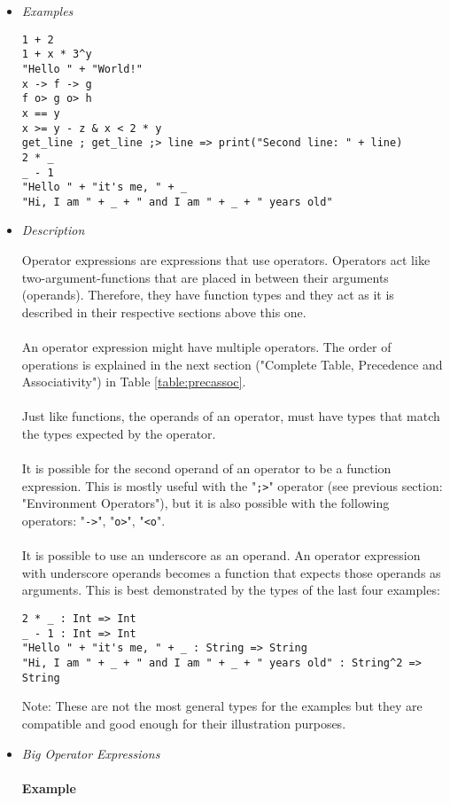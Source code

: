 \documentclass{article}
\begin{document}
\begin{itemize}
\item \textit{Examples}
\begin{verbatim}
1 + 2
1 + x * 3^y
"Hello " + "World!"
x -> f -> g
f o> g o> h
x == y
x >= y - z & x < 2 * y
get_line ; get_line ;> line => print("Second line: " + line)
2 * _
_ - 1
"Hello " + "it's me, " + _
"Hi, I am " + _ + " and I am " + _ + " years old"
\end{verbatim}

\item \textit{Description}

Operator expressions are expressions that use operators. Operators act like
two-argument-functions that are placed in between their arguments (operands).
Therefore, they have function types and they act as it is described in their
respective sections above this one.
\\\\
An operator expression might have multiple operators. The order of operations
is explained in the next section ("Complete Table, Precedence and
Associativity") in Table \ref{table:precassoc}.
\\\\
Just like functions, the operands of an operator, must have types that match
the types expected by the operator.
\\\\
It is possible for the second operand of an operator to be a function
expression.  This is mostly useful with the "\verb|;>|" operator (see
previous section: "Environment Operators"), but it is also possible with the
following operators: "\verb|->|", "\verb|o>|", "\verb|<o|".
\\\\
It is possible to use an underscore as an operand. An operator expression with
underscore operands becomes a function that expects those operands as
arguments.  This is best demonstrated by the types of the last four examples:

\begin{verbatim}
2 * _ : Int => Int
_ - 1 : Int => Int
"Hello " + "it's me, " + _ : String => String
"Hi, I am " + _ + " and I am " + _ + " years old" : String^2 => String
\end{verbatim}
Note: These are not the most general types for the examples but they are
compatible and good enough for their illustration purposes.

\newpage

\item \textit{Big Operator Expressions}\\\\
\textbf{Example}


\end{itemize}
\end{document}
